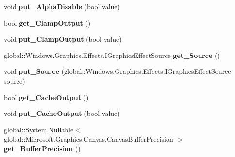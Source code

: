 \begin{DoxyCompactItemize}
void {\bfseries put\+\_\+\+Alpha\+Disable} (bool value)
\item 
\mbox{\label{class_microsoft_1_1_graphics_1_1_canvas_1_1_effects_1_1_table_transfer_effect_a238185a45fff4ece82f505b494c90307}} 
bool {\bfseries get\+\_\+\+Clamp\+Output} ()
\item 
\mbox{\label{class_microsoft_1_1_graphics_1_1_canvas_1_1_effects_1_1_table_transfer_effect_a7f810c0d46c569cf3f366d0d456c3996}} 
void {\bfseries put\+\_\+\+Clamp\+Output} (bool value)
\item 
\mbox{\label{class_microsoft_1_1_graphics_1_1_canvas_1_1_effects_1_1_table_transfer_effect_a237dc343b1165d3bc00b542c9174fcf0}} 
global\+::\+Windows.\+Graphics.\+Effects.\+I\+Graphics\+Effect\+Source {\bfseries get\+\_\+\+Source} ()
\item 
\mbox{\label{class_microsoft_1_1_graphics_1_1_canvas_1_1_effects_1_1_table_transfer_effect_acf80abbd4552400f00b0f225696e9c66}} 
void {\bfseries put\+\_\+\+Source} (global\+::\+Windows.\+Graphics.\+Effects.\+I\+Graphics\+Effect\+Source source)
\item 
\mbox{\label{class_microsoft_1_1_graphics_1_1_canvas_1_1_effects_1_1_table_transfer_effect_ac83c3dc4661a5047f4b2ee4c22c3c173}} 
bool {\bfseries get\+\_\+\+Cache\+Output} ()
\item 
\mbox{\label{class_microsoft_1_1_graphics_1_1_canvas_1_1_effects_1_1_table_transfer_effect_aea4abcb9071ee65956dd647784f39e50}} 
void {\bfseries put\+\_\+\+Cache\+Output} (bool value)
\item 
\mbox{\label{class_microsoft_1_1_graphics_1_1_canvas_1_1_effects_1_1_table_transfer_effect_a1783bed80c78c2fe9b0d26999eced115}} 
global\+::\+System.\+Nullable$<$ global\+::\+Microsoft.\+Graphics.\+Canvas.\+Canvas\+Buffer\+Precision $>$ {\bfseries get\+\_\+\+Buffer\+Precision} ()

\end{DoxyCompactItemize}
